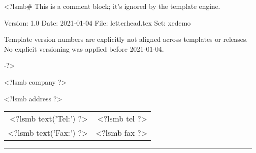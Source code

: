 <?lsmb#   This is a comment block; it's ignored by the template engine.

   Version:  1.0
   Date:     2021-01-04
   File:     letterhead.tex
   Set:      xedemo

Template version numbers are explicitly not aligned across templates or
releases. No explicit versioning was applied before 2021-01-04.

-?>
\parbox{\textwidth}{%
  \parbox[b]{.42\textwidth}{%
    <?lsmb company ?>
   
    <?lsmb address ?>
  }
  \parbox[b]{.2\textwidth}{
  }\hfill
  \begin{tabular}[b]{rr@{}}
  <?lsmb text('Tel:') ?> & <?lsmb tel ?>\\
  <?lsmb text('Fax:') ?> & <?lsmb fax ?>
  \end{tabular}

  \rule[1.5em]{\textwidth}{0.5pt}
}

